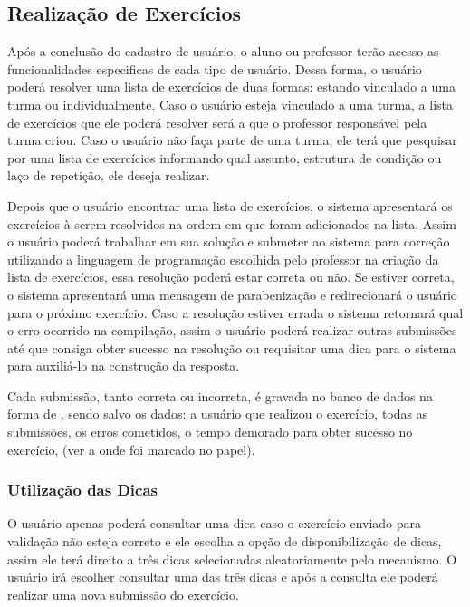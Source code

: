\subsection{Realização de Exercícios}

Após a conclusão do cadastro de usuário, o aluno ou professor terão acesso as funcionalidades especificas de cada tipo de usuário. Dessa forma, o usuário poderá resolver uma lista de exercícios de duas formas: estando vinculado a uma turma ou individualmente. Caso o usuário esteja vinculado a uma turma, a lista de exercícios que ele poderá resolver será a que o professor responsável pela turma criou. Caso o usuário não faça parte de uma turma, ele terá que pesquisar por uma lista de exercícios informando qual assunto, estrutura de condição ou laço de repetição, ele deseja realizar. 

Depois que o usuário encontrar uma lista de exercícios, o sistema apresentará os exercícios à serem resolvidos na ordem em que foram adicionados na lista. Assim o usuário poderá trabalhar em sua solução e submeter ao sistema para correção utilizando a linguagem de programação escolhida pelo professor na criação da lista de exercícios, essa resolução poderá estar correta ou não. Se estiver correta, o sistema apresentará uma mensagem de parabenização e redirecionará o usuário para o próximo exercício. Caso a resolução estiver errada o sistema retornará qual o erro ocorrido na compilação, assim o usuário poderá realizar outras submissões até que consiga obter sucesso na resolução ou requisitar uma dica para o sistema para auxiliá-lo na construção da resposta. 

Cada submissão, tanto correta ou incorreta, é gravada no banco de dados na forma de , sendo salvo os dados: a usuário que realizou o exercício, todas as submissões, os erros cometidos, o tempo demorado para obter sucesso no exercício, (ver a onde foi marcado no papel).


\subsubsection{Utilização das Dicas}

O usuário apenas poderá consultar uma dica caso o exercício enviado para validação não esteja correto e ele escolha a opção de disponibilização de dicas, assim ele terá direito a três dicas selecionadas aleatoriamente pelo mecanismo. O usuário irá escolher consultar uma das três dicas e após a consulta ele poderá realizar uma nova submissão do exercício.

